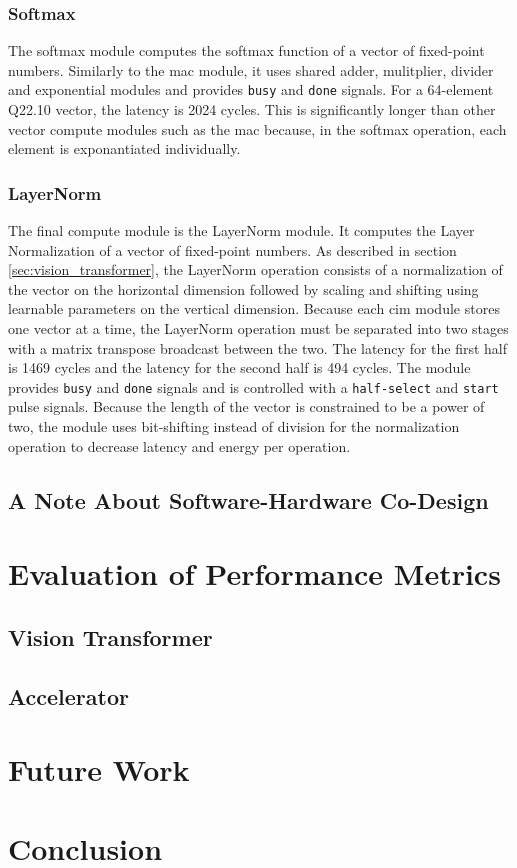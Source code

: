 \documentclass[12pt, hidelinks]{article}
\begin{document}
\subsubsection{Softmax}
The softmax module computes the softmax function of a vector of fixed-point numbers. Similarly to the \ac{mac} module, it uses shared adder, mulitplier, divider and exponential modules and provides \texttt{busy} and
\texttt{done} signals. For a 64-element Q22.10 vector, the latency is 2024 cycles. This is significantly longer than other vector compute modules such as the \ac{mac} because, in the softmax operation, each element is exponantiated
individually.

\subsubsection{LayerNorm}
The final compute module is the LayerNorm module. It computes the Layer Normalization of a vector of fixed-point numbers. As described in section \ref{sec:vision_transformer}, the LayerNorm operation consists of a normalization of
the vector on the horizontal dimension followed by scaling and shifting using learnable parameters on the vertical dimension. Because each \ac{cim} module stores one vector at a time, the LayerNorm operation must be separated into 
two stages with a matrix transpose broadcast between the two. The latency for the first half is 1469 cycles and the latency for the second half is 494 cycles. The module provides \texttt{busy} and \texttt{done} signals and is controlled
with a \texttt{half-select} and \texttt{start} pulse signals. Because the length of the vector is constrained to be a power of two, the module uses bit-shifting instead of division for the normalization operation to decrease latency and energy
per operation.

\subsection{A Note About Software-Hardware Co-Design}

\lipsum[1]

\newpage
\section{Evaluation of Performance Metrics}
\lipsum[1]
\subsection{Vision Transformer}
\lipsum[1]
\subsection{Accelerator}
\lipsum[1]

\newpage
\section{Future Work}
\lipsum[1]

\newpage
\section{Conclusion}
\lipsum[1]

\newpage

\printbibliography
\newpage





\newpage
\end{document}
